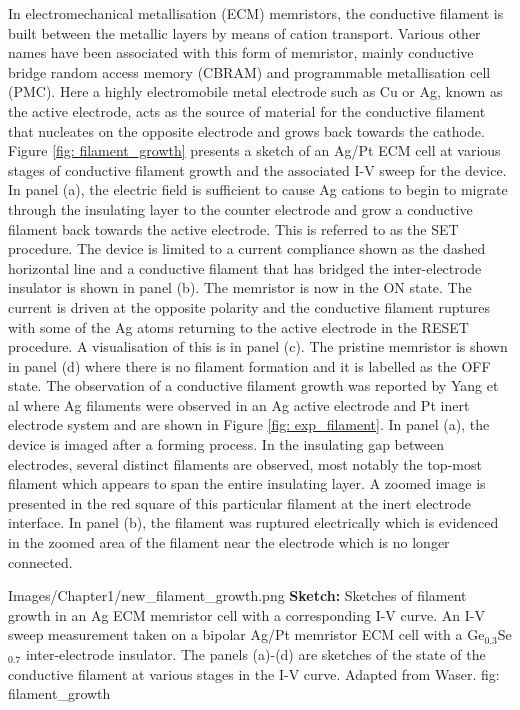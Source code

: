 In electromechanical metallisation (ECM) memristors\cite{waser2009}, the conductive filament is built between the metallic layers by means of cation transport. Various other names have been associated with this form of memristor, mainly conductive bridge random access memory\cite{jameson2013} (CBRAM) and programmable metallisation cell\cite{russo2009} (PMC). Here a highly electromobile metal electrode such as Cu or Ag, known as the active electrode, acts as the source of material for the conductive filament that nucleates on the opposite electrode and grows back towards the cathode\cite{menzel2017}. Figure \ref{fig: filament_growth} presents a sketch of an Ag/Pt ECM cell at various stages of conductive filament growth and the associated I-V sweep for the device\cite{waser2009}. In panel (a), the electric field is sufficient to cause Ag cations to begin to migrate through the insulating layer to the counter electrode and grow a conductive filament back towards the active electrode. This is referred to as the SET procedure. The device is limited to a current compliance shown as the dashed horizontal line and a conductive filament that has bridged the inter-electrode insulator is shown in panel (b). The memristor is now in the ON state. The current is driven at the opposite polarity and the conductive filament ruptures with some of the Ag atoms returning to the active electrode in the RESET procedure. A visualisation of this is in panel (c). The pristine memristor is shown in panel (d) where there is no filament formation and it is labelled as the OFF state. The observation of a conductive filament growth was reported by Yang et al\cite{yang2012} where Ag filaments were observed in an Ag active electrode and Pt inert electrode system and are shown in Figure \ref{fig: exp_filament}. In panel (a), the device is imaged after a forming process. In the insulating gap between electrodes, several distinct filaments are observed, most notably the top-most filament which appears to span the entire insulating layer. A zoomed image is presented in the red square of this particular filament at the inert electrode interface. In panel (b), the filament was ruptured electrically which is evidenced in the zoomed area of the filament near the electrode which is no longer connected. 

{Images/Chapter1/new_filament_growth.png}
{\textbf{Sketch:} Sketches of filament growth in an Ag ECM memristor cell with a corresponding I-V curve.}
{An I-V sweep measurement taken on a bipolar Ag/Pt memristor ECM cell with a Ge$_{0.3}$Se$_{0.7}$ inter-electrode insulator. The panels (a)-(d) are sketches of the state of the conductive filament at various stages in the I-V curve. Adapted from Waser\cite{waser2009}.}
{fig: filament_growth}

